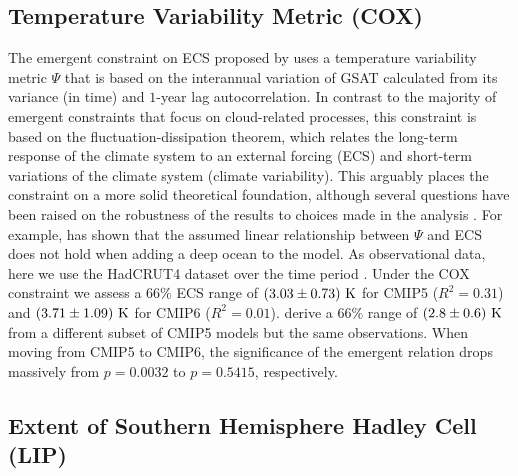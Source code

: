 \subsection{Temperature Variability Metric (COX)}
\label{subsec:05:cox}

The emergent constraint on \ac{ECS} proposed by \textcite{Cox2018} uses a
temperature variability metric $\Psi$ that is based on the interannual
variation of \ac{GSAT} calculated from its variance (in time) and $1$-year lag
autocorrelation. In contrast to the majority of emergent constraints that focus
on cloud-related processes, this constraint is based on the
fluctuation-dissipation theorem, which relates the long-term response of the
climate system to an external forcing (\ac{ECS}) and short-term variations of
the climate system (climate variability). This arguably places the constraint
on a more solid theoretical foundation, although several questions have been
raised on the robustness of the results to choices made in the analysis
\autocite{Brown2018, PoChedley2018, Rypdal2018}. For example,
\textcite{Annan2020} has shown that the assumed linear relationship between
$\Psi$ and \ac{ECS} does not hold when adding a deep ocean to the model. As
observational data, here we use the HadCRUT4 dataset \autocite{Morice2012} over
the time period . Under the COX constraint we assess a $66
\unit{\%}$ \ac{ECS} range of $\pmrangeunit{3.03}{0.73}{K}$ for \acs{CMIP}5
($R^2 = 0.31$) and $\pmrangeunit{3.71}{1.09}{K}$ for \acs{CMIP}6 ($R^2 =
0.01$). \textcite{Cox2018} derive a $66 \unit{\%}$ range of
$\pmrangeunit{2.8}{0.6}{K}$ from a different subset of \acs{CMIP}5 models but
the same observations. When moving from \acs{CMIP}5 to \acs{CMIP}6, the
significance of the emergent relation drops massively from $p = 0.0032$ to $p =
0.5415$, respectively.


\subsection{Extent of Southern Hemisphere Hadley Cell (LIP)}
\label{subsec:05:lip}

